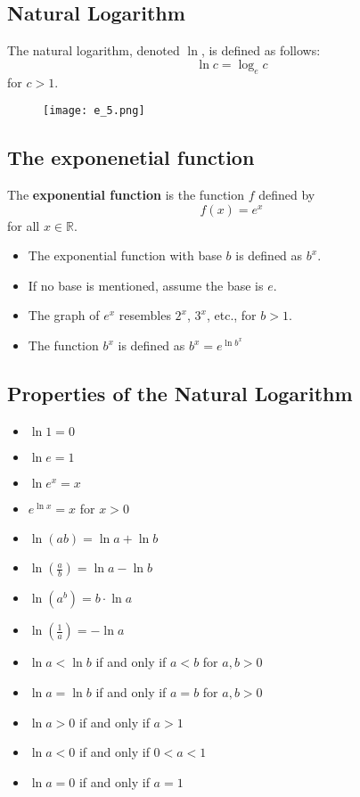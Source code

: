 \subsection{Natural Logarithm}
The natural logarithm, denoted \(\ln\), is defined as follows:
\[ \ln c = \log_e c \]
for \(c > 1\).
\begin{figure}
  \centering
  \texttt{[image: e\_5.png]}
\end{figure}

\subsection{The exponenetial function}
The \textbf{exponential function} is the function \(f\) defined by
\[ f(x) = e^{x} \]
for all \(x \in \mathbb{R}\).
\begin{itemize}
    \item The exponential function with base \( b \) is defined as \( b^x \).
    \item If no base is mentioned, assume the base is \( e \).
    \item The graph of \( e^x \) resembles \( 2^x \), \( 3^x \), etc., for \( b > 1 \).
    \item The function \(b^{x}\) is defined as \( b^{x} = e^{\ln b^{x}} \)
\end{itemize}

\subsection{Properties of the Natural Logarithm}
\begin{itemize}
  \item \(\ln 1 = 0\)
  \item \(\ln e = 1\)
  \item \(\ln e^{x} = x\)
  \item \(e^{\ln x} = x\) for \(x > 0\)
  \item \(\ln(ab) = \ln a + \ln b\)
  \item \(\ln\left(\frac{a}{b}\right) = \ln a - \ln b\)
  \item \(\ln(a^{b}) = b \cdot \ln a\)
  \item \(\ln\left(\frac{1}{a}\right) = -\ln a\)
  \item \(\ln a < \ln b\) if and only if \(a < b\) for \(a, b > 0\)
  \item \(\ln a = \ln b\) if and only if \(a = b\) for \(a, b > 0\)
  \item \(\ln a > 0\) if and only if \(a > 1\)
  \item \(\ln a < 0\) if and only if \(0 < a < 1\)
  \item \(\ln a = 0\) if and only if \(a = 1\)
\end{itemize}

